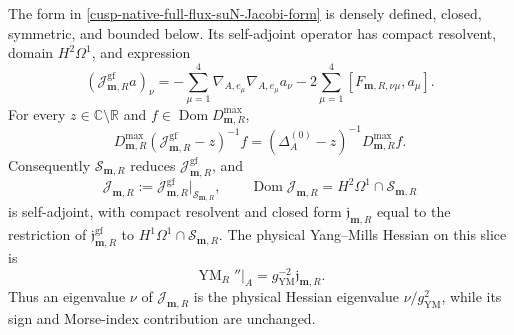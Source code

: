 \begin{proposition}
\label{cusp-native-full-flux-suN-Coulomb-reduction}
The form in \cref{cusp-native-full-flux-suN-Jacobi-form} is densely defined,
closed, symmetric, and bounded below.  Its self-adjoint operator has compact
resolvent, domain \(H^2\Omega^1\), and expression
\begin{equation}
 (\mathcal J_{\mathbf m,R}^{\mathrm{gf}}a)_\nu
 =-\sum_{\mu=1}^4\nabla_{A,e_\mu}\nabla_{A,e_\mu}a_\nu
  -2\sum_{\mu=1}^4[F_{\mathbf m,R,\nu\mu},a_\mu].
 \label{cusp-native-full-flux-suN-Jacobi-expression}
\end{equation}
For every \(z\in\mathbb C\setminus\mathbb R\) and
\(f\in\operatorname{Dom}D_{\mathbf m,R}^{\max}\),
\begin{equation}
 D_{\mathbf m,R}^{\max}
 (\mathcal J_{\mathbf m,R}^{\mathrm{gf}}-z)^{-1}f
 =(\Delta_A^{(0)}-z)^{-1}D_{\mathbf m,R}^{\max}f.
 \label{cusp-native-full-flux-suN-resolvent-intertwining}
\end{equation}
Consequently \(\mathscr S_{\mathbf m,R}\) reduces
\(\mathcal J_{\mathbf m,R}^{\mathrm{gf}}\), and
\begin{equation}
 \mathcal J_{\mathbf m,R}
 :=\mathcal J_{\mathbf m,R}^{\mathrm{gf}}
   \big|_{\mathscr S_{\mathbf m,R}},
 \qquad
 \operatorname{Dom}\mathcal J_{\mathbf m,R}
 =H^2\Omega^1\cap\mathscr S_{\mathbf m,R}
 \label{cusp-native-full-flux-suN-Coulomb-operator}
\end{equation}
is self-adjoint, with compact resolvent and closed form
\(\mathfrak j_{\mathbf m,R}\) equal to the restriction of
\(\mathfrak j_{\mathbf m,R}^{\mathrm{gf}}\) to
\(H^1\Omega^1\cap\mathscr S_{\mathbf m,R}\).  The physical Yang--Mills
Hessian on this slice is
\begin{equation}
 \operatorname{YM}_R''\big|_A
 =g_{\mathrm{YM}}^{-2}\mathfrak j_{\mathbf m,R}.
 \label{cusp-native-full-flux-suN-physical-Hessian}
\end{equation}
Thus an eigenvalue \(\nu\) of \(\mathcal J_{\mathbf m,R}\) is the physical
Hessian eigenvalue \(\nu/g_{\mathrm{YM}}^2\), while its sign and Morse-index
contribution are unchanged.
\end{proposition}

